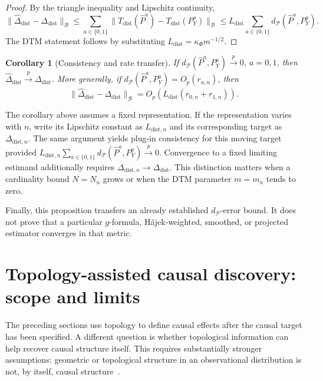 \documentclass[11pt,a4paper]{article}
\theoremstyle{plain}
\newtheorem{corollary}[theorem]{Corollary}
\theoremstyle{definition}
\theoremstyle{remark}
\newcommand{\1}{\mathbbm{1}}
\begin{document}
\begin{proof}
By the triangle inequality and Lipschitz continuity,
\[
\|\widehat\Delta_{\mathrm{dist}}
-\Delta_{\mathrm{dist}}\|_{\mathcal B}
\leq
\sum_{a\in\{0,1\}}
\|T_{\mathrm{dist}}(\widehat P^a)
-
T_{\mathrm{dist}}(P_Y^a)\|_{\mathcal B}
\leq
L_{\mathrm{dist}}
\sum_{a\in\{0,1\}}
d_{\mathcal P}(\widehat P^a,P_Y^a).
\]
The DTM statement follows by substituting \(L_{\mathrm{dist}}=\kappa_\Phi m^{-1/2}\).
\end{proof}

\begin{corollary}[Consistency and rate transfer]
\label{cor:consistency-distribution}
If \(d_{\mathcal P}(\widehat P^a,P_Y^a)
\xrightarrow{p}0,\ a=0,1\), then
\(\widehat\Delta_{\mathrm{dist}} \xrightarrow{p}
\Delta_{\mathrm{dist}}\). More generally, if
\(d_{\mathcal P}(\widehat P^a,P_Y^a)=O_p(r_{a,n})\), then
\[
\|\widehat\Delta_{\mathrm{dist}}
-
\Delta_{\mathrm{dist}}\|_{\mathcal B}
=
O_p\!\left(
L_{\mathrm{dist}}(r_{0,n}+r_{1,n})
\right).
\]
\end{corollary}

The corollary above assumes a fixed representation. If the
representation varies with \(n\), write its Lipschitz constant
as \(L_{\mathrm{dist},n}\) and its corresponding target as
\(\Delta_{\mathrm{dist},n}\). The same argument yields
plug-in consistency for this moving target provided
\(L_{\mathrm{dist},n} \sum_{a\in\{0,1\}}
d_{\mathcal P}(\widehat P^a,P_Y^a) \xrightarrow{p}0\). Convergence to a fixed limiting estimand additionally requires
\(\Delta_{\mathrm{dist},n}\to\Delta_{\mathrm{dist}}\). This
distinction matters when a cardinality bound \(N=N_n\) grows
or when the DTM parameter \(m=m_n\) tends to zero.

Finally, this proposition transfers an already established
\(d_{\mathcal P}\)-error bound. It does not prove that a particular \(g\)-formula, Hájek-weighted, smoothed, or projected estimator converges in that metric.


\section{Topology-assisted causal discovery: scope and limits}
\label{sec:topological-identifiability}

The preceding sections use topology to define causal effects after the causal target has been specified. A different question is whether topological information can help recover causal structure itself. This requires substantially stronger assumptions: geometric or topological structure in an observational distribution is not, by itself, causal
structure~\citep{spirtes2000,pearl2009}.
\end{document}
